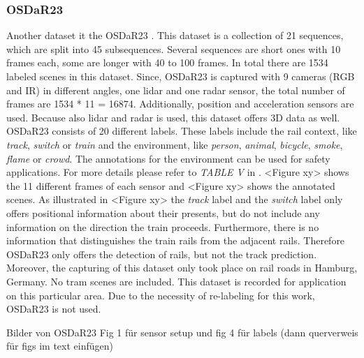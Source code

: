 \subsubsection{OSDaR23}
Another dataset it the OSDaR23 \cite{oSDaR23}. This dataset is a collection of 21 sequences, which are split into 45 subsequences. Several sequences are short ones with 10 frames each, some are longer with 40 to 100 frames. In total there are 1534 labeled scenes in this dataset. Since, OSDaR23 is captured with 9 cameras (\ac{RGB} and \ac{IR}) in different angles, one lidar and one radar sensor, the total number of frames are 1534 * 11 = 16874. Additionally, position and acceleration sensors are used. Because also lidar and radar is used, this dataset offers 3D data as well. OSDaR23 consists of 20 different labels. These labels include the rail context, like \textit{track}, \textit{switch} or \textit{train} and the environment, like \textit{person}, \textit{animal}, \textit{bicycle}, \textit{smoke}, \textit{flame} or \textit{crowd}. The annotations for the environment can be used for safety applications. For more details please refer to \textit{TABLE V} in \cite{oSDaR23}. <Figure xy> shows the 11 different frames of each sensor and <Figure xy> shows the annotated scenes. As illustrated in <Figure xy> the \textit{track} label and the \textit{switch} label only offers positional information about their presents, but do not include any information on the direction the train proceeds. Furthermore, there is no information that distinguishes the train rails from the adjacent rails. Therefore OSDaR23 only offers the detection of rails, but not the track prediction. Moreover, the capturing of this dataset only took place on rail roads in Hamburg, Germany. No tram scenes are included. This dataset is recorded for application on this particular area. Due to the necessity of re-labeling for this work, OSDaR23 is not used.

\vspace{5cm} %

Bilder von OSDaR23 Fig 1 für sensor setup und fig 4 für labels (dann querverweis für figs im text einfügen)



\vspace{5cm} %

